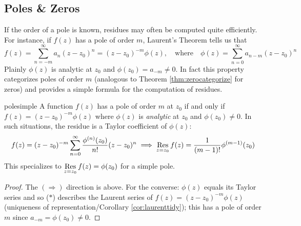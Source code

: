 \clearpage




\subsection{Poles \& Zeros}


If the order of a pole is known, residues may often be computed quite efficiently. For instance, if $f(z)$ has a pole of order $m$, Laurent's Theorem tells us that
\[
	f(z)=\sum_{n=-m}^\infty a_n(z-z_0)^n =(z-z_0)^{-m}\phi(z),
	\quad\text{where}\quad
	\phi(z)=\sum_{n=0}^\infty a_{n-m}(z-z_0)^n \tag{$\ast$}
\]
Plainly $\phi(z)$ is analytic at $z_0$ and $\phi(z_0)=a_{-m}\neq 0$. In fact this property categorizes poles of order $m$ (analogous to Theorem \ref{thm:zerocategorize} for zeros) and provides a simple formula for the computation of residues. 


\begin{thm}{}{polesimple}
	A function $f(z)$ has a pole of order $m$ at $z_0$ if and only if $f(z)=(z-z_0)^{-m}\phi(z)$ where $\phi(z)$ is \emph{analytic} at $z_0$ and $\phi(z_0)\neq 0$. In such situations, the residue is a Taylor coefficient of $\phi(z)$:\footnotemark
	\[
		f(z)=(z-z_0)^{-m}\sum_{n=0}^\infty \frac{\phi^{(n)}(z_0)}{n!}(z-z_0)^n \implies \operatorname*{Res}_{z=z_0}f(z)=\frac 1{(m-1)!}\phi^{(m-1)}(z_0)
	\]
	This specializes to $\operatorname*{Res}\limits_{z=z_0}f(z)=\phi(z_0)$ for a simple pole.
\end{thm}



\begin{proof}
	The $(\Rightarrow)$ direction is above. For the converse: $\phi(z)$ equals its Taylor series and so ($\ast$) describes the Laurent series of $f(z)=(z-z_0)^{-m}\phi(z)$ (uniqueness of representation/Corollary \ref{cor:laurenttidy}); this has a pole of order $m$ since $a_{-m}=\phi(z_0)\neq 0$.
\end{proof}


